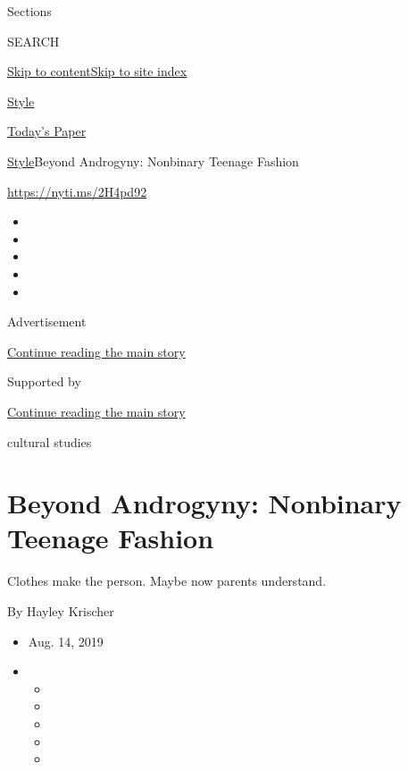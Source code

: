 Sections

SEARCH

\protect\hyperlink{site-content}{Skip to
content}\protect\hyperlink{site-index}{Skip to site index}

\href{https://www.nytimes.com/section/style}{Style}

\href{https://myaccount.nytimes.com/auth/login?response_type=cookie\&client_id=vi}{}

\href{https://www.nytimes.com/section/todayspaper}{Today's Paper}

\href{/section/style}{Style}\textbar{}Beyond Androgyny: Nonbinary
Teenage Fashion

\href{https://nyti.ms/2H4pd92}{https://nyti.ms/2H4pd92}

\begin{itemize}
\item
\item
\item
\item
\item
\end{itemize}

Advertisement

\protect\hyperlink{after-top}{Continue reading the main story}

Supported by

\protect\hyperlink{after-sponsor}{Continue reading the main story}

cultural studies

\hypertarget{beyond-androgyny-nonbinary-teenage-fashion}{%
\section{Beyond Androgyny: Nonbinary Teenage
Fashion}\label{beyond-androgyny-nonbinary-teenage-fashion}}

Clothes make the person. Maybe now parents understand.

By Hayley Krischer

\begin{itemize}
\item
  Aug. 14, 2019
\item
  \begin{itemize}
  \item
  \item
  \item
  \item
  \item
  \end{itemize}
\end{itemize}


